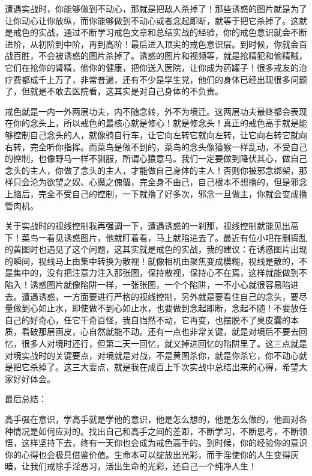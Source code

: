 \documentclass{ctexart}
\begin{document}
遭遇实战时，你能够做到不动心，那就是把敌人杀掉了！那些诱惑的图片就是为了让你动心让你放纵，而你能够做到不动心或者念起即断，就等于把它杀掉了。这就是戒色的实战，通过不断学习戒色文章和总结实战的经验，你的戒色意识就会不断进阶，从初阶到中阶，再到高阶！最后进入顶尖的戒色意识层。到时候，你就会百战百胜，不会被诱惑的图片杀掉了。诱惑的图片和视频等，就是抢精犯和偷精贼，它们在抢你的肾精，偷你的健康，把你送入医院，让你成为药罐子！很多戒友的治疗费都成千上万了，非常普遍，还有不少是学生党，他们的身体已经出现很多问题了，但就是不敢去医院看，这其实是对自己身体的不负责。

戒色就是一内一外两层功夫，内不随念转，外不为境迁。这两层功夫最终都会表现在你的念头上，所以戒色的最核心就是修心！就是修念头！真正的戒色高手就是能够控制自己念头的人，就像骑自行车，让它向左转它就向左转，让它向右转它就向右转，完全听你指挥。而菜鸟是做不到的，菜鸟的念头像猿猴一样乱动，不受自己的控制，也像野马一样不驯服，所谓心猿意马。我们一定要做到降伏其心，做自己念头的主人，你做了念头的主人，才能做自己身体的主人！否则你被邪念绑架，那样只会沦为欲望之奴、心魔之傀儡，完全身不由己，自己根本不想撸的，但是邪念上脑后，完全不受自己的控制，一下就撸了好多次，邪念一旦做主，你就会变成撸管肉机。

关于实战时的视线控制我再强调一下，遭遇诱惑的一刹那，视线控制就能见出高下！菜鸟一看见诱惑图片，他就盯着看，马上就陷进去了。最近有位小吧在删捣乱的黄图时也遇见了这个问题，这其实就是戒色的实战，我的建议：在诱惑图片出现的瞬间，视线马上由集中转换为散视！就像相机由聚焦变成模糊，视线是散的，不是集中的，没有把注意力注入那张图，保持散视，保持心不在焉，这样就能做到不陷入！诱惑图片就像陷阱一样，一张张图，一个个陷阱，一不小心就很容易陷进去。遭遇诱惑，一方面要进行严格的视线控制，另外就是要看住自己的念头，要尽量做到心如止水，即使做不到心如止水，也要做到念起即断，念起不随！不要放任自己的好奇心，任它千奇百怪，我自岿然不动，它再变，也摆脱不了臭皮囊的本质，看破那层画皮，心自然就能不动。还有一点也非常关键，就是对境后不要去回忆，很多人对境时还行，但第二天一回忆，就又掉进回忆的陷阱里了。这三点就是对境实战时的关键要点，对境就是对战，不是黄图杀你，就是你杀它，你不动心就是把它杀掉了。这三大要点，就是我在成百上千次实战中总结出来的心得，希望大家好好体会。

最后总结：

高手强在意识，学高手就是学他的意识，他是怎么想的，他是怎么做的，他面对各种情况是如何应对的。找出自己和高手之间的差距，不断学习，不断思考，不断领悟，这样坚持下去，终有一天你也会成为戒色高手的。到时候，你的经验你的意识你的心得也会极具借鉴价值。生命本可以绽放出光彩，而手淫使你的人生变得灰暗，让我们戒除手淫恶习，活出生命的光彩，还自己一个纯净人生！
\end{document}
